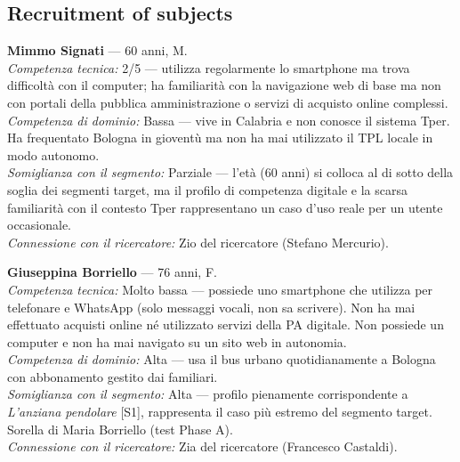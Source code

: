 ﻿\documentclass[11pt,a4paper]{article}
\begin{document}
\subsection*{Recruitment of subjects}
\begin{tcolorbox}[base]

\textbf{Mimmo Signati} --- 60 anni, M.\\[0.3cm]
\textit{Competenza tecnica:} 2/5 --- utilizza regolarmente lo
smartphone ma trova difficoltà con il computer; ha familiarità
con la navigazione web di base ma non con portali della pubblica
amministrazione o servizi di acquisto online complessi.\\[0.2cm]
\textit{Competenza di dominio:} Bassa --- vive in Calabria e
non conosce il sistema Tper. Ha frequentato Bologna in
gioventù ma non ha mai utilizzato il TPL locale in modo
autonomo.\\[0.2cm]
\textit{Somiglianza con il segmento:} Parziale --- l'età (60
anni) si colloca al di sotto della soglia dei segmenti target,
ma il profilo di competenza digitale e la scarsa familiarità
con il contesto Tper rappresentano un caso d'uso reale per
un utente occasionale.\\[0.2cm]
\textit{Connessione con il ricercatore:} Zio del ricercatore
(Stefano Mercurio).

\vspace{0.2cm}

\textbf{Giuseppina Borriello} --- 76 anni, F.\\[0.3cm]
\textit{Competenza tecnica:} Molto bassa --- possiede uno
smartphone che utilizza per telefonare e WhatsApp (solo
messaggi vocali, non sa scrivere). Non ha mai effettuato
acquisti online né utilizzato servizi della PA digitale.
Non possiede un computer e non ha mai navigato su un sito
web in autonomia.\\[0.2cm]
\textit{Competenza di dominio:} Alta --- usa il bus urbano
quotidianamente a Bologna con abbonamento gestito dai
familiari.\\[0.2cm]
\textit{Somiglianza con il segmento:} Alta --- profilo
pienamente corrispondente a \textit{L'anziana pendolare}
[S1], rappresenta il caso più estremo del segmento target.
Sorella di Maria Borriello (test Phase A).\\[0.2cm]
\textit{Connessione con il ricercatore:} Zia del ricercatore
(Francesco Castaldi).
\end{tcolorbox}

\vspace{0.2cm}
\end{document}
